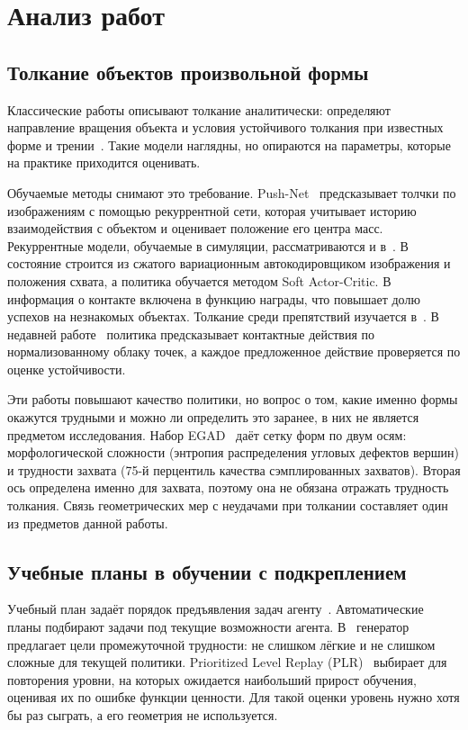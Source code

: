 \documentclass{misisarticle}
\begin{document}
\section{Анализ работ}

\subsection{Толкание объектов произвольной формы}

Классические работы описывают толкание аналитически: определяют направление вращения объекта и условия устойчивого толкания при известных форме и трении~\cite{mason1986, lynch1996}. Такие модели наглядны, но опираются на параметры, которые на практике приходится оценивать.

Обучаемые методы снимают это требование. Push-Net~\cite{li2018} предсказывает толчки по изображениям с помощью рекуррентной сети, которая учитывает историю взаимодействия с объектом и оценивает положение его центра масс. Рекуррентные модели, обучаемые в симуляции, рассматриваются и в~\cite{cong2020}. В~\cite{cong2022} состояние строится из сжатого вариационным автокодировщиком изображения и положения схвата, а политика обучается методом Soft Actor-Critic. В~\cite{wang2023} информация о контакте включена в функцию награды, что повышает долю успехов на незнакомых объектах. Толкание среди препятствий изучается в~\cite{dengler2022, luz2025}. В недавней работе~\cite{yuan2026} политика предсказывает контактные действия по нормализованному облаку точек, а каждое предложенное действие проверяется по оценке устойчивости.

Эти работы повышают качество политики, но вопрос о том, какие именно формы окажутся трудными и можно ли определить это заранее, в них не является предметом исследования. Набор EGAD~\cite{morrison2020} даёт сетку форм по двум осям: морфологической сложности (энтропия распределения угловых дефектов вершин) и трудности захвата (75-й перцентиль качества сэмплированных захватов). Вторая ось определена именно для захвата, поэтому она не обязана отражать трудность толкания. Связь геометрических мер с неудачами при толкании составляет один из предметов данной работы.

\subsection{Учебные планы в обучении с подкреплением}

Учебный план задаёт порядок предъявления задач агенту~\cite{portelas2020}. Автоматические планы подбирают задачи под текущие возможности агента. В~\cite{florensa2018} генератор предлагает цели промежуточной трудности: не слишком лёгкие и не слишком сложные для текущей политики. Prioritized Level Replay (PLR)~\cite{jiang2021} выбирает для повторения уровни, на которых ожидается наибольший прирост обучения, оценивая их по ошибке функции ценности. Для такой оценки уровень нужно хотя бы раз сыграть, а его геометрия не используется.
\end{document}
